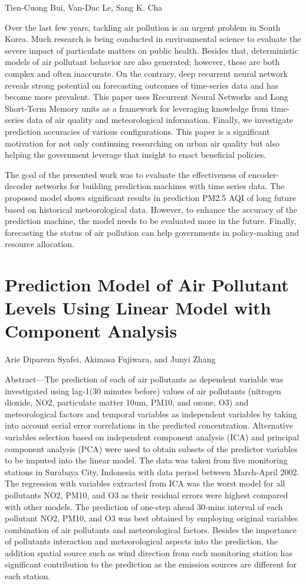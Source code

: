 Tien-Cuong Bui, Van-Duc Le, Sang K. Cha

Over the last few years, tackling air pollution is an urgent problem in
South Korea. Much research is being conducted in environmental science to
evaluate the severe impact of particulate matters on public health. Besides that,
deterministic models of air pollutant behavior are also generated; however, these
are both complex and often inaccurate. On the contrary, deep recurrent neural
network reveals strong potential on forecasting outcomes of time-series data and
has become more prevalent. This paper uses Recurrent Neural Networks and
Long Short-Term Memory units as a framework for leveraging knowledge from
time-series data of air quality and meteorological information. Finally, we
investigate prediction accuracies of various configurations. This paper is a
significant motivation for not only continuing researching on urban air quality
but also helping the government leverage that insight to enact beneficial policies.

The goal of the presented work was to evaluate the effectiveness of encoder-decoder
networks for building prediction machines with time series data. The proposed model
shows significant results in prediction PM2.5 AQI of long future based on historical
meteorological data. However, to enhance the accuracy of the prediction machine, the
model needs to be evaluated more in the future. Finally, forecasting the status of air
pollution can help governments in policy-making and resource allocation.

\section{Prediction Model of Air Pollutant Levels Using Linear Model with Component Analysis}

Arie Dipareza Syafei, Akimasa Fujiwara, and Junyi Zhang

Abstract—The prediction of each of air pollutants as
dependent variable was investigated using lag-1(30 minutes
before) values of air pollutants (nitrogen dioxide, NO2,
particulate matter 10um, PM10, and ozone, O3) and
meteorological factors and temporal variables as independent
variables by taking into account serial error correlations in the
predicted concentration. Alternative variables selection based
on independent component analysis (ICA) and principal
component analysis (PCA) were used to obtain subsets of the
predictor variables to be imputed into the linear model. The
data was taken from five monitoring stations in Surabaya City,
Indonesia with data period between March-April 2002. The
regression with variables extracted from ICA was the worst
model for all pollutants NO2, PM10, and O3 as their residual
errors were highest compared with other models. The
prediction of one-step ahead 30-mins interval of each pollutant
NO2, PM10, and O3 was best obtained by employing original
variables combination of air pollutants and meteorological
factors. Besides the importance of pollutants interaction and
meteorological aspects into the prediction, the addition spatial
source such as wind direction from each monitoring station has
significant contribution to the prediction as the emission
sources are different for each station.

